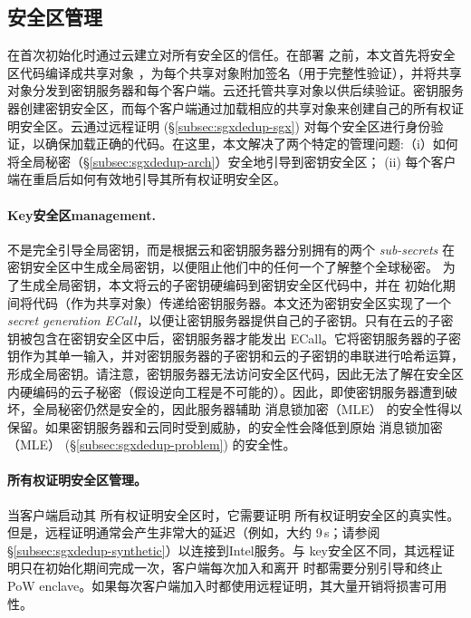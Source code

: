 \subsection{安全区管理}
\label{subsec:sgxdedup-enclave-management}

\sysnameS 在首次初始化时通过云建立对所有安全区的信任。在部署 \sysnameS 之前，本文首先将安全区代码编译成共享对象 \cite{sgx}，为每个共享对象附加签名（用于完整性验证），并将共享对象分发到密钥服务器和每个客户端。云还托管共享对象以供后续验证。密钥服务器创建密钥安全区，而每个客户端通过加载相应的共享对象来创建自己的所有权证明安全区。云通过远程证明 (\S\ref{subsec:sgxdedup-sgx}) 对每个安全区进行身份验证，以确保加载正确的代码。在这里，本文解决了两个特定的管理问题:（i）如何将全局秘密（\S\ref{subsec:sgxdedup-arch}）安全地引导到密钥安全区； (ii) 每个客户端在重启后如何有效地引导其所有权证明安全区。

\paragraph*{Key安全区management.} \sysnameS 不是完全引导全局密钥，而是根据云和密钥服务器分别拥有的两个 \textit{ sub-secrets} 在密钥安全区中生成全局密钥，以便阻止他们中的任何一个了解整个全球秘密。
为了生成全局密钥，本文将云的子密钥硬编码到密钥安全区代码中，并在 \sysnameS 初始化期间将代码（作为共享对象）传递给密钥服务器。本文还为密钥安全区实现了一个\textit{ secret generation ECall}，以便让密钥服务器提供自己的子密钥。只有在云的子密钥被包含在密钥安全区中后，密钥服务器才能发出 ECall。它将密钥服务器的子密钥作为其单一输入，并对密钥服务器的子密钥和云的子密钥的串联进行哈希运算，形成全局密钥。请注意，密钥服务器无法访问安全区代码，因此无法了解在安全区内硬编码的云子秘密（假设逆向工程是不可能的）。因此，即使密钥服务器遭到破坏，全局秘密仍然是安全的，因此服务器辅助 消息锁加密（MLE） 的安全性得以保留。如果密钥服务器和云同时受到威胁，\sysnameS 的安全性会降低到原始 消息锁加密（MLE） (\S\ref{subsec:sgxdedup-problem}) 的安全性。

\paragraph*{所有权证明安全区管理。} 当客户端启动其 所有权证明安全区时，它​​需要证明 所有权证明安全区的真实性。但是，远程证明通常会产生非常大的延迟（例如，大约 9\,s；请参阅 \S\ref{subsec:sgxdedup-synthetic}）以连接到Intel服务。与 key安全区不同，其远程证明只在初始化期间完成一次，客户端每次加入和离开 \sysnameS 时都需要分别引导和终止 PoW enclave。如果每次客户端加入时都使用远程证明，其大量开销将损害可用性。

